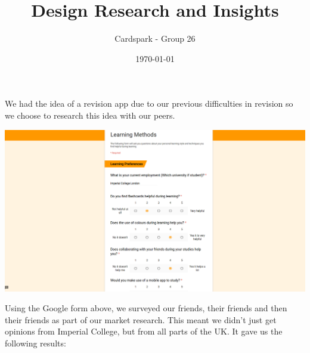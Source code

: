 \documentclass{article}
\begin{document}
\title{Design Research and Insights}
\author{Cardspark - Group 26}
\date{\today}
\maketitle 

We had the idea of a revision app due to our previous difficulties in revision so we choose to research this idea with our peers.

\begin{center}
	\vspace{1mm}
	\includegraphics[scale=0.14]{form.png}
	\vspace{1mm}
\end{center}

Using the Google form above, we surveyed our friends, their friends and then their friends as part of our market research.  This meant we didn't just get opinions from Imperial College, but from all parts of the UK.  It gave us the following results:
\end{document}
